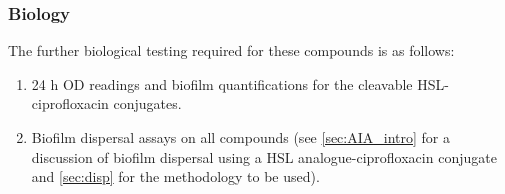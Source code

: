\subsubsection{Biology}

The further biological testing required for these compounds is as follows:

\begin{enumerate}

\item 24 h OD readings and biofilm quantifications for the cleavable HSL-ciprofloxacin conjugates.

\item Biofilm dispersal assays on all compounds (see \ref{sec:AIA_intro} for a discussion of biofilm dispersal using a HSL analogue-ciprofloxacin conjugate and \ref{sec:disp} for the methodology to be used).

\end{enumerate}